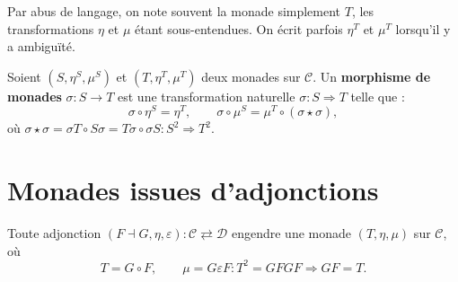 \begin{notation}\label{not:monade}
Par abus de langage, on note souvent la monade simplement $T$,
les transformations $\eta$ et $\mu$ étant sous-entendues.
On écrit parfois $\eta^T$ et $\mu^T$ lorsqu'il y a ambiguïté.
\end{notation}

\begin{definition}\label{def:morphisme-monades}
Soient $(S, \eta^S, \mu^S)$ et $(T, \eta^T, \mu^T)$ deux monades
sur $\mathcal{C}$.
Un \textbf{morphisme de monades} $\sigma \colon S \to T$ est une
transformation naturelle $\sigma \colon S \Rightarrow T$ telle que :
\[
    \sigma \circ \eta^S = \eta^T, \qquad
    \sigma \circ \mu^S = \mu^T \circ (\sigma \star \sigma),
\]
où $\sigma \star \sigma = \sigma T \circ S\sigma = T\sigma \circ \sigma S
\colon S^2 \Rightarrow T^2$.
\end{definition}


\section{Monades issues d'adjonctions}\label{sec:monade-adjonction}

\begin{theoreme}\label{thm:adjonction-monade}
Toute adjonction $(F \dashv G, \eta, \varepsilon) \colon
\mathcal{C} \rightleftarrows \mathcal{D}$ engendre une monade
$(T, \eta, \mu)$ sur $\mathcal{C}$, où
\[
    T = G \circ F, \qquad
    \mu = G \varepsilon F \colon T^2 = GFGF \Rightarrow GF = T.
\]
\end{theoreme}


